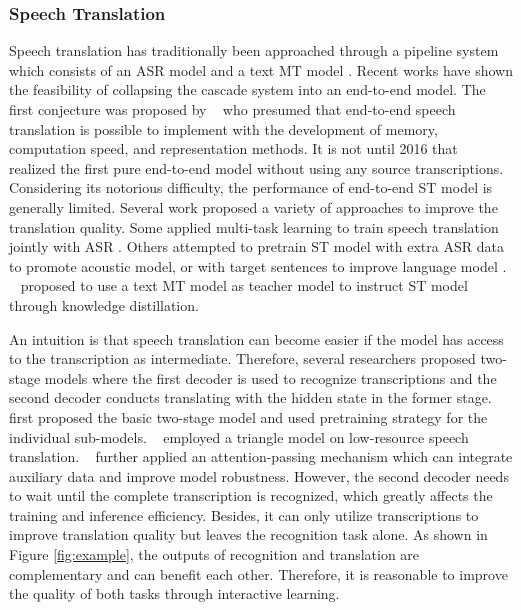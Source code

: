 \documentclass[letterpaper]{article} %
\begin{document}
\subsubsection{Speech Translation} Speech translation has traditionally been approached through a pipeline system which consists of an ASR model and a text MT model \cite{sutskever2014sequence,Bahdanau:2015,chan2016listen,chiu2017state,vaswani2017attention}.
Recent works have shown the feasibility of collapsing the cascade system into an end-to-end model. %
The first conjecture was proposed by \citeauthor{1999The}~ who presumed that end-to-end speech translation is possible to implement with the development of memory, computation speed, and representation methods.
It is not until 2016 that~\citeauthor{berard2016listen}~ realized the first pure end-to-end model without using any source transcriptions.
Considering its notorious difficulty, the performance of end-to-end ST model is generally limited. Several work proposed a variety of approaches to improve the translation quality. Some applied multi-task learning to train speech translation jointly with ASR \cite{weiss2017sequence,anastasopoulos2018leveraging,berard2018end}. Others attempted to pretrain ST model with extra ASR data to promote acoustic model, or with target sentences to improve language model \cite{bansal2018pre,jia2019leveraging}. \citeauthor{liu2019end}~ proposed to use a text MT model as teacher model to instruct ST model through knowledge distillation.

An intuition is that speech translation can become easier if the model has access to the transcription as intermediate. Therefore, several researchers proposed two-stage models where the first decoder is used to recognize transcriptions and the second decoder conducts translating with the hidden state in the former stage.
\citeauthor{kano2017structured}~ first proposed the basic two-stage model and used pretraining strategy for the individual sub-models.  \citeauthor{anastasopoulos2018tied}~ employed a triangle model on low-resource speech translation. \citeauthor{sperber2019attention}~ further applied an attention-passing mechanism which can integrate auxiliary data and improve model robustness.
However, the second decoder needs to wait until the complete transcription is recognized, which greatly affects the training and inference efficiency. Besides, it can only utilize transcriptions to improve translation quality but leaves the recognition task alone. As shown in Figure \ref{fig:example}, the outputs of recognition and translation are complementary and can benefit each other. Therefore, it is reasonable to improve the quality of both tasks through interactive learning.
\end{document}
